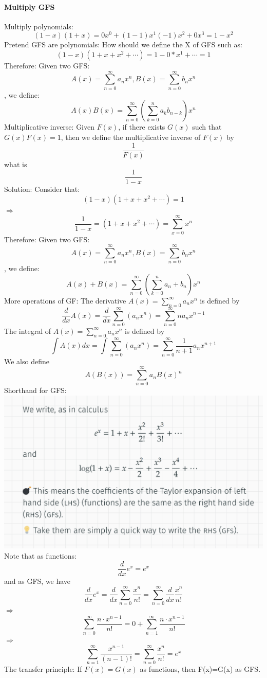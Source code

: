 \documentclass{article}
\begin{document}
\paragraph{Multiply GFS}
Multiply polynomials:\newline
$$(1-x)(1+x)=0x^0+(1-1)x^1 (-1)x^2+0x^3=1-x^2$$
Pretend GFS are polynomials:\newline
How should we define the X of GFS such as:
$$(1-x)(1+x+x^2+\cdots)=1-0*x^1+\cdots =1$$
Therefore:\newline
Given two GFS:
$$A(x)=\sum_{n=0}^{\infty}a_n x^n,B(x)=\sum_{n=0}^{\infty}b_n x^n$$,
we define:
$$A(x)B(x)=\sum_{n=0}^{\infty}(\sum_{k=0}^{n}a_kb_{n-k})x^n$$
Multiplicative inverse:\newline
Given $F(x)$, if there exists $G(x)$ such that $G(x)F(x) = 1$, then we
define the multiplicative inverse of $F(x)$ by
$$\frac{1}{F(x)}$$
what is 
$$\frac{1}{1-x}$$
Solution:\newline
Consider that:
$$(1-x)(1+x+x^2+\cdots)=1$$
$\Longrightarrow$
$$\frac{1}{1-x}=(1+x+x^2+\cdots)=\sum_{x=0}^{\infty}x^n$$
Therefore:\newline
Given two GFS:
$$A(x)=\sum_{n=0}^{\infty}a_n x^n,B(x)=\sum_{n=0}^{\infty}b_n x^n$$,
we define:
$$A(x)+B(x)=\sum_{n=0}^{\infty}(\sum_{k=0}^{n}a_n+b_n)x^n$$
More operations of GF:\newline
The derivative $A(x)=\sum_{n=0}^{\infty}a_nx^n$ is defined by
$$\frac{d}{dx}A(x)=\frac{d}{dx}\sum_{n=0}^{\infty}(a_nx^n)=\sum_{n=0}^{\infty}na_nx^{n-1}$$
The integral of $A(x)=\sum_{n=0}^{\infty}a_nx^n$ is defined by
$$\int A(x)dx=\int \sum_{n=0}^{\infty}(a_nx^n)=\sum_{n=0}^{\infty}\frac{1}{n+1}a_nx^{n+1}$$
We also define
$$A(B(x))=\sum_{n=0}^{\infty}a_n{B(x)}^n$$
Shorthand for GFS:\newline
\includegraphics{0007}\newline
Note that as functions:
$$\frac{d}{dx}e^x=e^x$$
and as GFS, we have 
$$\frac{d}{dx}e^x=\frac{d}{dx}\sum_{n=0}^{\infty}\frac{x^n}{n!}=\sum_{n=0}^{\infty}\frac{d}{dx} \frac{x^n}{n!}$$
$\Longrightarrow$
$$\sum_{n=0}^{\infty}\frac{n\cdot x^{n-1}}{n!}=0+\sum_{n=1}^{\infty}\frac{n\cdot x^{n-1}}{n!}$$
$\Longrightarrow$
$$\sum_{n=1}^{\infty}\frac{x^{n-1}}{(n-1)!}=\sum_{n=0}^{\infty}\frac{x^n}{n!}=e^x$$
$$$$
The transfer principle:\newline
If $F(x)=G(x)$ as functions, then F(x)=G(x) as GFS.
\end{document}
